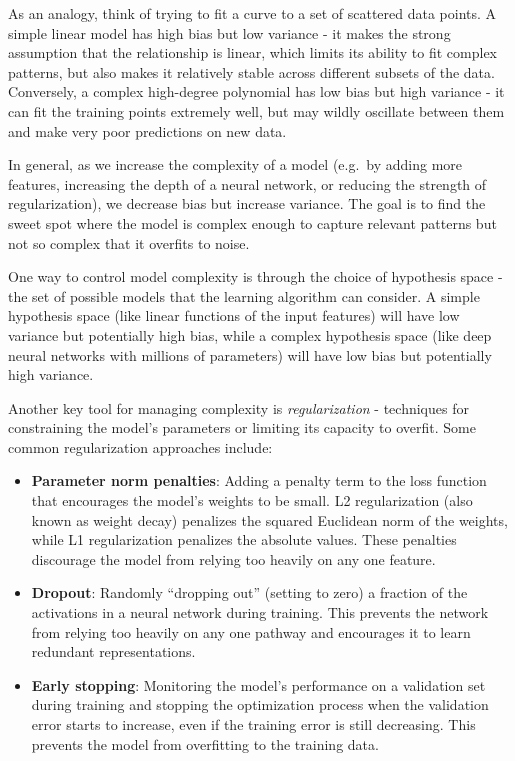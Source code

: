 \documentclass[
  9pt,
  letterpaper,
  abstract,
  titlepage]{scrbook}
\begin{document}
As an analogy, think of trying to fit a curve to a set of scattered data
points. A simple linear model has high bias but low variance - it makes
the strong assumption that the relationship is linear, which limits its
ability to fit complex patterns, but also makes it relatively stable
across different subsets of the data. Conversely, a complex high-degree
polynomial has low bias but high variance - it can fit the training
points extremely well, but may wildly oscillate between them and make
very poor predictions on new data.

In general, as we increase the complexity of a model (e.g.~by adding
more features, increasing the depth of a neural network, or reducing the
strength of regularization), we decrease bias but increase variance. The
goal is to find the sweet spot where the model is complex enough to
capture relevant patterns but not so complex that it overfits to noise.

One way to control model complexity is through the choice of hypothesis
space - the set of possible models that the learning algorithm can
consider. A simple hypothesis space (like linear functions of the input
features) will have low variance but potentially high bias, while a
complex hypothesis space (like deep neural networks with millions of
parameters) will have low bias but potentially high variance.

Another key tool for managing complexity is \emph{regularization} -
techniques for constraining the model's parameters or limiting its
capacity to overfit. Some common regularization approaches include:

\begin{itemize}
\item
  \textbf{Parameter norm penalties}: Adding a penalty term to the loss
  function that encourages the model's weights to be small. L2
  regularization (also known as weight decay) penalizes the squared
  Euclidean norm of the weights, while L1 regularization penalizes the
  absolute values. These penalties discourage the model from relying too
  heavily on any one feature.
\item
  \textbf{Dropout}: Randomly ``dropping out'' (setting to zero) a
  fraction of the activations in a neural network during training. This
  prevents the network from relying too heavily on any one pathway and
  encourages it to learn redundant representations.
\item
  \textbf{Early stopping}: Monitoring the model's performance on a
  validation set during training and stopping the optimization process
  when the validation error starts to increase, even if the training
  error is still decreasing. This prevents the model from overfitting to
  the training data.
\end{itemize}
\end{document}

